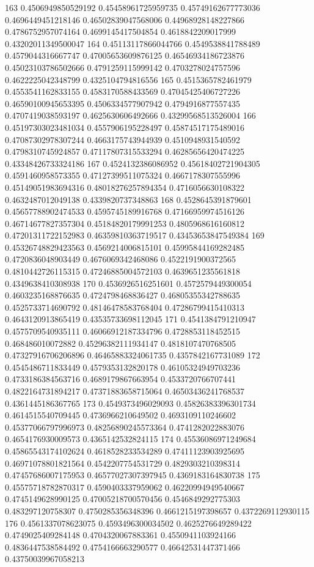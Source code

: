 163 0.4506949850529192 0.45458961725959735 0.45749162677773036 0.4696449451218146 0.46502839047568006 0.44968928148227866 0.4786752957074164 0.4699145417504854 0.4618842209017999 0.43202011349500047
164 0.45113117866044766 0.4549538841788489 0.4579044316667747 0.47005653609876125 0.46546934186723876 0.45023103786502666 0.4791259115999142 0.4703278024757596 0.4622225042348799 0.4325104794816556
165 0.4515365782461979 0.4553541162833155 0.4583170588433569 0.47045425406727226 0.46590100945653395 0.4506334577907942 0.4794916877557435 0.4707419038593197 0.4625630606492666 0.43299568513526004
166 0.45197303023481034 0.4557906195228497 0.45874517175489016 0.47087302978307244 0.4663175743944939 0.4510948931540592 0.4798310745924857 0.47117807315533294 0.46285656420474225 0.43348426733324186
167 0.4524132386086952 0.45618402721904305 0.4591460958573355 0.47127399511075324 0.4667178307555996 0.45149051983694316 0.48018276257894354 0.4716056630108322 0.4632487012049138 0.4339820737348863
168 0.4528645391879601 0.45657788902474533 0.4595745189916768 0.47166959974516126 0.46714677827357304 0.45184820179991253 0.4805968616160812 0.47201311722152983 0.46359810363719517 0.43453653847549384
169 0.45326748829423563 0.4569214006815101 0.45995844169282485 0.4720836048903449 0.4676069342468086 0.4522191900372565 0.4810442726115315 0.47246885004572103 0.4639651235561818 0.4349638410308938
170 0.4536926516251601 0.4572579449300054 0.4603235168876635 0.4724798468836427 0.46805355342788635 0.4525733714690792 0.48146478583768404 0.47286799415410313 0.4643120913865419 0.43535733698112045
171 0.4541384791210947 0.4575709540935111 0.46066912187334796 0.4728853118452515 0.468486010072882 0.45296382111934147 0.4818107470768505 0.47327916706206896 0.46465883324061735 0.4357842167731089
172 0.4545486711833449 0.4579353132820178 0.46105324949703236 0.4733186384563716 0.4689179867663954 0.4533720766707441 0.4822164731894217 0.47371883658715064 0.46503436241768537 0.4361445186367765
173 0.4549373496029093 0.45826383396301734 0.4614515540709445 0.4736966210649502 0.4693109110246602 0.45377066797996973 0.48256890245573364 0.4741282022883076 0.4654176930009573 0.4365142532824115
174 0.45536086971249684 0.45865543174102624 0.4618528233534289 0.47411123903925695 0.46971078801821564 0.4542207754531729 0.4829303210398314 0.47457686007175953 0.46577027307397945 0.4369183164830738
175 0.45575718782870317 0.4590403337959062 0.46220994949540667 0.4745149628990125 0.47005218700570456 0.4546849292775303 0.483297120758307 0.4750285356348396 0.4661215197398657 0.4372269112930115
176 0.4561337078623075 0.4593496300034502 0.4625276649289422 0.4749025409284148 0.4704320067883361 0.4550941103924166 0.4836447538584492 0.4754166663290577 0.46642531447371466 0.43750039967058213
